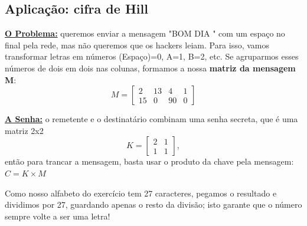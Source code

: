 \documentclass[../numerical_methods.tex]{subfiles}
\begin{document}
\subsection{Aplicação: cifra de Hill}
\textbf{\underline{O Problema:}} queremos enviar a mensagem "BOM DIA " com um espaço no final pela rede, mas não queremos que os hackers leiam.
Para isso, vamos transformar letras em números (Espaço)=0, A=1, B=2, etc. Se agruparmos esses números de dois em dois nas colunas, formamos a nossa \textbf{matriz da mensagem M}:
\[
	M = \begin{bmatrix}
		2  & 13 & 4  & 1 \\
		15 & 0  & 90 & 0
	\end{bmatrix}
\]

\textbf{\underline{A Senha:}} o remetente e o destinatário combinam uma senha secreta, que é uma matriz 2x2
\[
	K = \begin{bmatrix}
		2 & 1 \\
		1 & 1
	\end{bmatrix},
\]
então para trancar a mensagem, basta usar o produto da chave pela mensagem: \(C = K \times M\)
\begin{tcolorbox}[
		skin=enhanced,
		title=Observação,
		fonttitle=\bfseries,
		colframe=black,
		colbacktitle=cyan!75!white,
		colback=cyan!15,
		colbacklower=black,
		coltitle=black,
		drop fuzzy shadow,
	]
	Como nosso alfabeto do exercício tem 27 caracteres, pegamos o resultado e dividimos por 27, guardando apenas o resto da divisão; isto garante que o número sempre volte a ser uma letra!
\end{tcolorbox}
\end{document}

